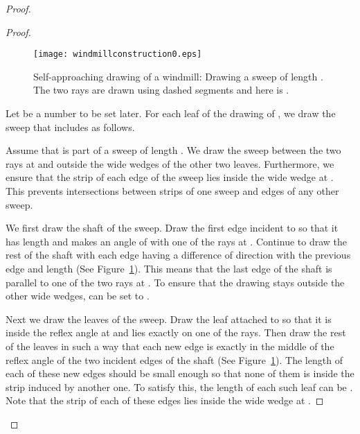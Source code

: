\documentclass[11pt]{article}
\newcommand{\changeAL}[1]{{#1}}
\newcommand{\changeS}[1]{{#1}}
\begin{document}
\begin{proof}
\begin{proof}
\begin{figure}
\begin{center}
\texttt{[image: windmillconstruction0.eps]}
\caption{Self-approaching drawing of a windmill: Drawing a sweep of \changeAL{length }. The two rays are drawn using dashed segments and
\changeAL{ here is .}}
\label{windmillembeddfig2}
\end{center}
\end{figure}



Let  be a number to be set later. For each leaf  of the drawing of , we draw the sweep that includes  as follows. \changeAL{Assume that  is part of a sweep of length . We draw the sweep between the two rays at  and outside the wide wedges of the other two leaves.
Furthermore,  we ensure that  the strip  of each edge  of the sweep lies inside the wide wedge at .  This prevents intersections between strips of one sweep and edges of any other sweep.


We first draw the shaft of the sweep.
Draw the first edge incident to  so that it has length  and makes an angle of    with one of the rays at . Continue to draw the rest of the shaft with each edge having a  difference of direction with the previous edge and length  (See Figure~\ref{windmillembeddfig2}). This means that the last edge of the shaft is parallel to one of the two rays at .
To ensure that the drawing stays outside the other wide wedges,
 can be set to .





Next we draw the leaves of the sweep.
Draw the leaf attached to  so that it is inside the reflex angle at  and lies exactly on one of the rays. Then draw the rest of the leaves in such a way that each new edge is exactly in the middle of the reflex angle of the two incident edges of the shaft (See Figure~\ref{windmillembeddfig2}). The length of each of these new edges should be small enough so that none of them is inside the strip induced by another one. To satisfy this, the length of each such leaf can be \changeS{.}
Note that the strip of each of these edges lies inside the wide wedge at .
}
\end{proof}



\end{proof}
\end{document}
